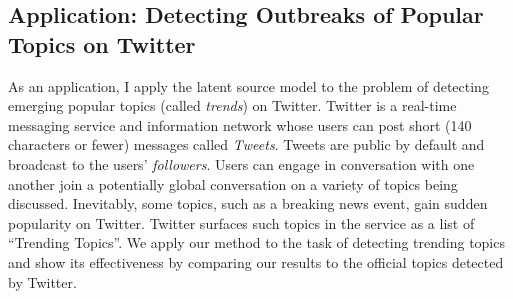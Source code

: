 \subsection{Application: Detecting Outbreaks of Popular Topics on Twitter}

As an application, I apply the latent source model to the problem of detecting
emerging popular topics (called {\em trends}) on Twitter. Twitter is a real-time
messaging service and information network whose users can post short (140
characters or fewer) messages called {\em Tweets}. Tweets are public by default
and broadcast to the users' {\em followers}. Users can engage in conversation
with one another join a potentially global conversation on a variety of topics
being discussed. Inevitably, some topics, such as a breaking news event, gain
sudden popularity on Twitter. Twitter surfaces such topics in the service as a
list of ``Trending Topics''. We apply our method to the task of detecting
trending topics and show its effectiveness by comparing our results to the
official topics detected by Twitter.
